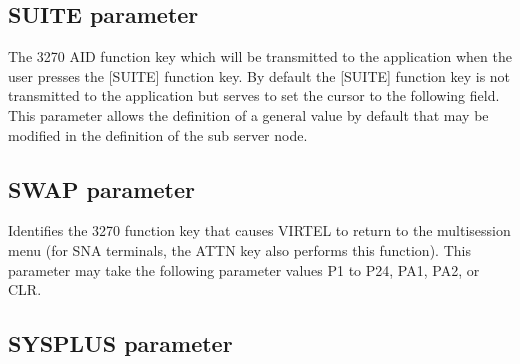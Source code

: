 \documentclass[letterpaper,10pt,english]{sphinxmanual}
\begin{document}
\subsection{SUITE parameter}
\label{\detokenize{Installation_Guide:suite-parameter}}\label{\detokenize{Installation_Guide:index-120}}
\begin{sphinxVerbatim}[commandchars=\\\{\}]
 
\end{sphinxVerbatim}

\sphinxAtStartPar
{} \sphinxhyphen{} The 3270 AID function key which will be transmitted to the application when the user presses the {[}SUITE{]} function key. By default the {[}SUITE{]} function key is not transmitted to the application but serves to set the cursor to the following field. This parameter allows the definition of a general value by default that may be modified in the definition of the sub server node.

\ignorespaces 

\subsection{SWAP parameter}
\label{\detokenize{Installation_Guide:swap-parameter}}\label{\detokenize{Installation_Guide:index-121}}
\begin{sphinxVerbatim}[commandchars=\\\{\}]
 
\end{sphinxVerbatim}

\sphinxAtStartPar
{} \sphinxhyphen{} Identifies the 3270 function key that causes VIRTEL to return to the multi\sphinxhyphen{}session menu (for SNA terminals, the ATTN key also performs this function). This parameter may take the following parameter values P1 to P24, PA1, PA2, or CLR.

\ignorespaces 

\subsection{SYSPLUS parameter}
\label{\detokenize{Installation_Guide:sysplus-parameter}}\label{\detokenize{Installation_Guide:index-122}}
\begin{sphinxVerbatim}[commandchars=\\\{\}]
 
\end{sphinxVerbatim}
\end{document}
